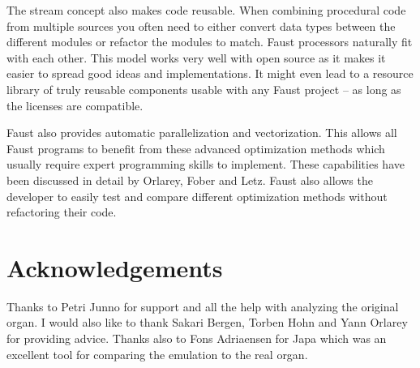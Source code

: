 \documentclass[11pt,a4paper]{article}
\begin{document}
The stream concept also makes code reusable. When combining procedural code from multiple sources you often need to either convert data types between the different modules or refactor the modules to match. Faust processors naturally fit with each other. This model works very well with open source as it makes it easier to spread good ideas and implementations. It might even lead to a resource library of truly reusable components usable with any Faust project -- as long as the licenses are compatible.


Faust also provides automatic parallelization and vectorization. This allows all Faust programs to benefit from these advanced optimization methods which usually require expert programming skills to implement. These capabilities have been discussed in detail by Orlarey, Fober and Letz\cite{orlarey:09a}. Faust also allows the developer to easily test and compare different optimization methods without refactoring their code.

\section{Acknowledgements}

Thanks to Petri Junno for support and all the help with analyzing the original organ. I would also like to thank Sakari Bergen, Torben Hohn and Yann Orlarey for providing advice. Thanks also to Fons Adriaensen for Japa which was an excellent tool for comparing the emulation to the real organ.



\end{document}
